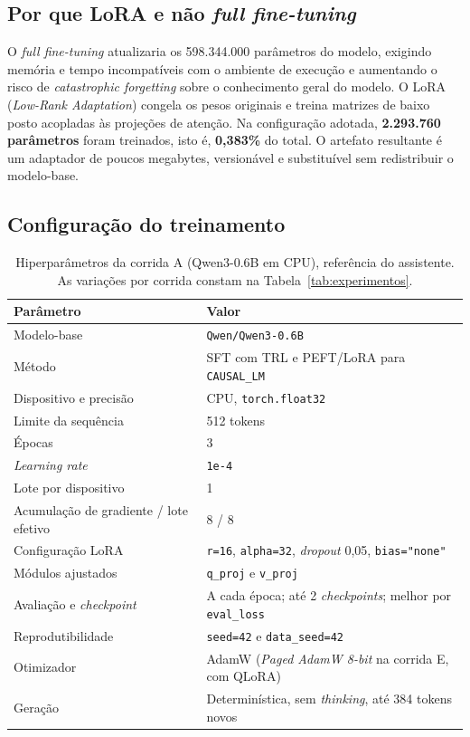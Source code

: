 \documentclass[12pt,a4paper]{article}
\begin{document}
\subsection{Por que LoRA e não \emph{full fine-tuning}}

O \emph{full fine-tuning} atualizaria os 598.344.000 parâmetros do modelo,
exigindo memória e tempo incompatíveis com o ambiente de execução e aumentando o
risco de \emph{catastrophic forgetting} sobre o conhecimento geral do modelo. O
LoRA (\emph{Low-Rank Adaptation}) congela os pesos originais e treina matrizes de
baixo posto acopladas às projeções de atenção. Na configuração adotada,
\textbf{2.293.760 parâmetros} foram treinados, isto é, \textbf{0,383\%} do total.
O artefato resultante é um adaptador de poucos megabytes, versionável e
substituível sem redistribuir o modelo-base.

\subsection{Configuração do treinamento}

\begin{table}[htbp]
\centering
\caption{Hiperparâmetros da corrida A (Qwen3-0.6B em CPU), referência do
assistente. As variações por corrida constam na Tabela~\ref{tab:experimentos}.}
\label{tab:hiperparametros}
\footnotesize
\begin{tabularx}{\textwidth}{L{5.3cm} X}
\toprule
\textbf{Parâmetro} & \textbf{Valor} \\
\midrule
Modelo-base & \texttt{Qwen/Qwen3-0.6B} \\
Método & SFT com TRL e PEFT/LoRA para \texttt{CAUSAL\_LM} \\
Dispositivo e precisão & CPU, \texttt{torch.float32} \\
Limite da sequência & 512 tokens \\
Épocas & 3 \\
\emph{Learning rate} & \texttt{1e-4} \\
Lote por dispositivo & 1 \\
Acumulação de gradiente / lote efetivo & 8 / 8 \\
Configuração LoRA & \texttt{r=16}, \texttt{alpha=32}, \emph{dropout} 0,05, \texttt{bias="none"} \\
Módulos ajustados & \texttt{q\_proj} e \texttt{v\_proj} \\
Avaliação e \emph{checkpoint} & A cada época; até 2 \emph{checkpoints}; melhor por \texttt{eval\_loss} \\
Reprodutibilidade & \texttt{seed=42} e \texttt{data\_seed=42} \\
Otimizador & AdamW (\emph{Paged AdamW 8-bit} na corrida E, com QLoRA) \\
Geração & Determinística, sem \emph{thinking}, até 384 tokens novos \\
\bottomrule
\end{tabularx}
\end{table}
\end{document}
